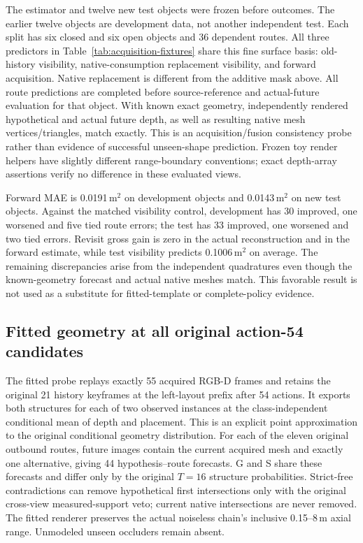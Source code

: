 The estimator and twelve new test objects were frozen before outcomes. The earlier twelve objects are development data, not another independent test. Each split has six closed and six open objects and 36 dependent routes. All three predictors in Table~\ref{tab:acquisition-fixtures} share this fine surface basis: old-history visibility, native-consumption replacement visibility, and forward acquisition. Native replacement is different from the additive mask above. All route predictions are completed before source-reference and actual-future evaluation for that object. With known exact geometry, independently rendered hypothetical and actual future depth, as well as resulting native mesh vertices/triangles, match exactly. This is an acquisition/fusion consistency probe rather than evidence of successful unseen-shape prediction. Frozen toy render helpers have slightly different range-boundary conventions; exact depth-array assertions verify no difference in these evaluated views.

Forward MAE is 0.0191\,m$^2$ on development objects and 0.0143\,m$^2$ on new test objects. Against the matched visibility control, development has 30 improved, one worsened and five tied route errors; the test has 33 improved, one worsened and two tied errors. Revisit gross gain is zero in the actual reconstruction and in the forward estimate, while test visibility predicts 0.1006\,m$^2$ on average. The remaining discrepancies arise from the independent quadratures even though the known-geometry forecast and actual native meshes match. This favorable result is not used as a substitute for fitted-template or complete-policy evidence.


\subsection{Fitted geometry at all original action-54 candidates}
The fitted probe replays exactly 55 acquired RGB-D frames and retains the original 21 history keyframes at the left-layout prefix after 54 actions. It exports both structures for each of two observed instances at the class-independent conditional mean of depth and placement. This is an explicit point approximation to the original conditional geometry distribution. For each of the eleven original outbound routes, future images contain the current acquired mesh and exactly one alternative, giving 44 hypothesis--route forecasts. G and S share these forecasts and differ only by the original $T=16$ structure probabilities. Strict-free contradictions can remove hypothetical first intersections only with the original cross-view measured-support veto; current native intersections are never removed. The fitted renderer preserves the actual noiseless chain's inclusive 0.15--8\,m axial range. Unmodeled unseen occluders remain absent.

